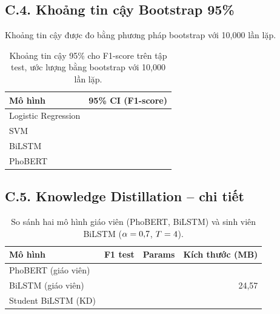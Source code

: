 \subsection*{C.4. Khoảng tin cậy Bootstrap 95\%}

Khoảng tin cậy được đo bằng phương pháp bootstrap với 10{,}000 lần lặp.

\begin{table}[H]
  \centering
  \small
  \caption[Khoảng tin cậy Bootstrap 95\% cho F1-score]{Khoảng tin cậy 95\% cho F1-score trên tập test, ước lượng bằng bootstrap với 10{,}000 lần lặp.}
  \label{tab:appendix_bootstrap}
  \begin{tabular}{l c}
    \toprule
    \textbf{Mô hình} & \textbf{95\% CI (F1-score)} \\
    \midrule
    Logistic Regression & \lrfonecI{} \\
    SVM                 & \svmfonecI{} \\
    BiLSTM              & \bilstmfonecI{} \\
    PhoBERT             & \phobertfonecI{} \\
    \bottomrule
  \end{tabular}
\end{table}

\subsection*{C.5. Knowledge Distillation -- chi tiết}

\begin{table}[H]
  \centering
  \small
  \caption[So sánh giáo viên -- sinh viên]{So sánh hai mô hình giáo viên (PhoBERT, BiLSTM) và sinh viên BiLSTM ($\alpha=0{,}7$, $T=4$).}
  \label{tab:appendix_distillation}
  \begin{tabular}{l r r r}
    \toprule
    \textbf{Mô hình} & \textbf{F1 test} & \textbf{Params} & \textbf{Kích thước (MB)} \\
    \midrule
    PhoBERT (giáo viên)  & \phobertfonetab{} & \phobertparamcount{} & \phobertsizemB{} \\
    BiLSTM (giáo viên)   & \bilstmfonetab{}  & \bilstmparamcount{}  & 24{,}57 \\
    Student BiLSTM (KD)  & \studentfone{}    & \studentparams{}    & \studentsizemB{} \\
    \bottomrule
  \end{tabular}
\end{table}

